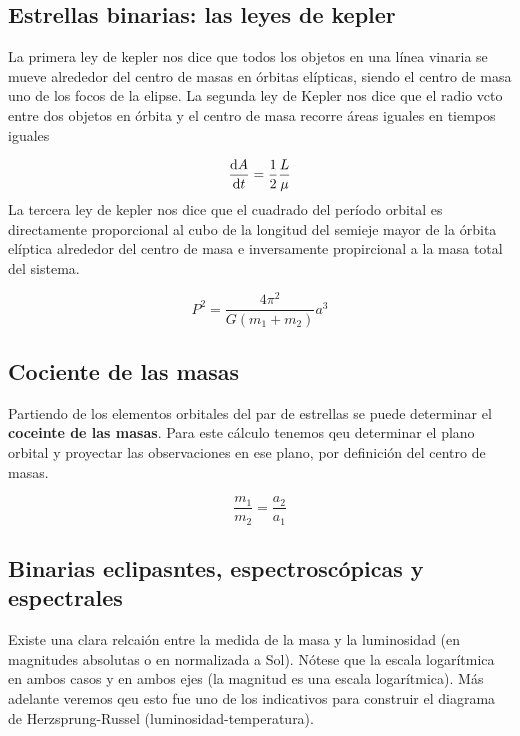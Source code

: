 \subsection{Estrellas binarias: las leyes de kepler}

La primera ley de kepler nos dice que todos los objetos en una línea vinaria se mueve alrededor del centro de masas en órbitas elípticas, siendo el centro de masa uno de los focos de la elipse. La segunda ley de Kepler nos dice que el radio vcto entre dos objetos en órbita y el centro de masa recorre áreas iguales en tiempos iguales 

\begin{equation*}
    \frac{\mathrm{d} A}{\mathrm{d} t} = \frac{1}{2} \frac{L}{\mu}
\end{equation*}
La tercera ley de kepler nos dice que el cuadrado del período orbital es directamente proporcional al cubo de la longitud del semieje mayor de la órbita elíptica alrededor del centro de masa e inversamente propircional a la masa total del sistema. 

\begin{equation*}
    P^2 = \frac{4\pi^2}{G(m_1+m_2)} a^3
\end{equation*}

\subsection{Cociente de las masas}

Partiendo de los elementos orbitales del par de estrellas se puede determinar el \textbf{coceinte de las masas}. Para este cálculo tenemos qeu determinar el plano orbital y proyectar las observaciones en ese plano, por definición del centro de masas. 

\begin{equation*}
    \frac{m_1}{m_2} = \frac{a_2}{a_1}
\end{equation*}

\subsection{Binarias eclipasntes, espectroscópicas y espectrales}

Existe una clara relcaión entre la medida de la masa y la luminosidad (en magnitudes absolutas o en normalizada a Sol). Nótese que la escala logarítmica en ambos casos y en ambos ejes (la magnitud es una escala logarítmica). Más adelante veremos qeu esto fue uno de los indicativos para construir el diagrama de Herzsprung-Russel (luminosidad-temperatura).

